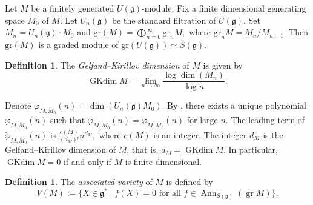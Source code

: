 \documentclass[reqno,12pt]{amsart}
\numberwithin{equation}{section}
\theoremstyle{plain}
\theoremstyle{definition}
\newtheorem{Defff}[Thm]{Definition}
\begin{document}









Let $M$ be a finitely generated $U(\mathfrak{g})$-module. Fix a finite dimensional generating space $M_0$ of $M$. Let $U_{n}(\mathfrak{g})$ be the standard filtration of $U(\mathfrak{g})$. Set $M_n=U_n(\mathfrak{g})\cdot M_0$ and
\(
\text{gr} (M)=\bigoplus\limits_{n=0}^{\infty} \text{gr}_n M,
\)
where $\text{gr}_n M=M_n/{M_{n-1}}$. Then $\text{gr}(M)$ is a graded module of $\text{gr}(U(\mathfrak{g}))\simeq S(\mathfrak{g})$.


\begin{Defff} The \textit{Gelfand--Kirillov dimension} of $M$  is given by
\begin{equation*}
	\operatorname{GKdim} M = \overline{\lim\limits_{n\rightarrow \infty}}\frac{\log\dim( M_n )}{\log n}.
\end{equation*}
\end{Defff}

 Denote $\varphi_{M,M_0}(n)=\dim( U_n(\mathfrak{g})M_{0})$. By \cite[Chapter VII. Thm. 41]{Za-Sa}, there exists a unique polynomial $\tilde{\varphi}_{M,M_0}(n)$ such that $\varphi_{M,M_0}(n)=\tilde{\varphi}_{M,M_0}(n)$ for large $n$. The leading term
of $\tilde{\varphi}_{M,M_0}(n)$ is $\frac{c(M)}{(d_{M})!}n^{d_{M}},$ where $c(M)$ is an integer. The integer $d_M$ is the
Gelfand--Kirillov dimension of $M$, that is, $d_M=\operatorname{GKdim} M$. 
In particular, $\operatorname{GKdim} M=0$ if and only if $M$ is finite-dimensional.

\begin{Defff}
	The  \textit{associated variety} of $M$ is defined by
\begin{equation*}
	V(M):=\{X\in \mathfrak{g}^* \mid f(X)=0 \text{ for all~} f\in \operatorname{Ann}_{S(\mathfrak{g})}(\operatorname{gr} M)\}.
\end{equation*}
\end{Defff}
\end{document}
